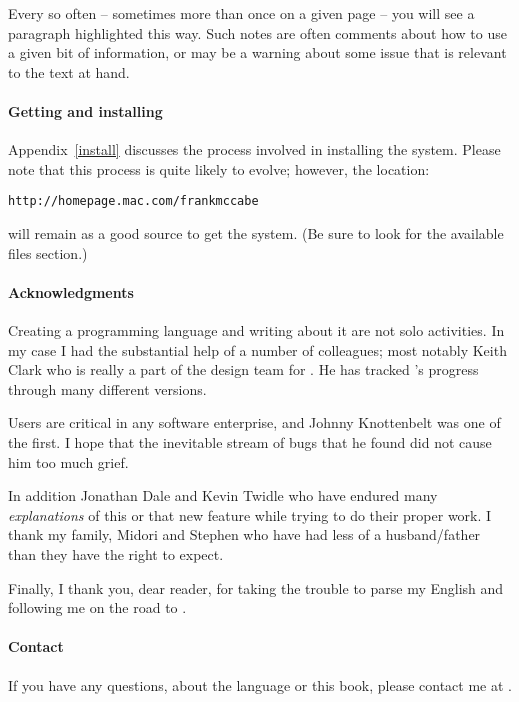\begin{aside}
Every so often -- sometimes more than once on a given page -- you will see a paragraph highlighted this way. Such notes are often comments about how to use a given bit of information, or may be a warning about some issue that is relevant to the text at hand.
\end{aside}

\paragraph{Getting and installing \go}
Appendix~\vref{install} discusses the process involved in installing the \go system. Please note that this process is quite likely to evolve; however, the location:
\begin{alltt}
http://homepage.mac.com/frankmccabe
\end{alltt}
 will remain as a good source to get the \go system. (Be sure to look for the available files section.)

\paragraph{Acknowledgments}
Creating a programming language and writing about it are not solo activities. In my case I had the substantial help of a number of colleagues; most notably Keith Clark who is really a part of the design team for \go. He has tracked \go's progress through many different versions. 

Users are critical in any software enterprise, and Johnny Knottenbelt was one of the first. I hope that the inevitable stream of bugs that he found did not cause him too much grief.

In addition Jonathan Dale and Kevin Twidle who have endured many \emph{explanations} of this or that new feature while trying to do their proper work. I thank my family, Midori and Stephen who have had less of a husband/father than they have the right to expect.

Finally, I thank you, dear reader, for taking the trouble to parse my English and following me on the road to \go.

\paragraph{Contact}
If you have any questions, about the \go language or this book, please contact me at .
